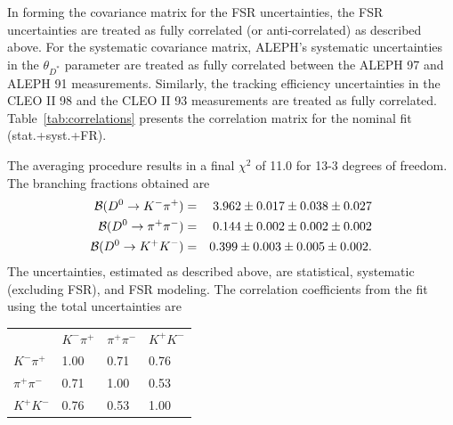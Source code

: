 In forming the covariance matrix for the FSR uncertainties, the FSR
uncertainties are treated as fully correlated (or anti-correlated) as 
described above.  For the systematic covariance matrix, ALEPH's systematic
uncertainties in the $\theta_{D^*}$ parameter are treated
as fully correlated between the ALEPH 97 and ALEPH 91 measurements.  Similarly,
the tracking efficiency uncertainties in the CLEO II 98 and the
CLEO II 93 measurements are treated as fully correlated.  
Table~\ref{tab:correlations} presents the correlation matrix for 
the nominal fit (stat.+syst.+FR).

The averaging procedure results in a 
final $\chi^2$ of 11.0 for 13-3 degrees 
of freedom.  The branching
fractions obtained are
\begin{eqnarray*}
  {\cal B}(D^0\to K^-\pi^+)   & = & 3.962 \pm 0.017 \pm 0.038 \pm 0.027 \\
  {\cal B}(D^0\to \pi^+\pi^-) & = & 0.144 \pm 0.002 \pm 0.002 \pm 0.002 \\
  {\cal B}(D^0\to K^+ K^-)    & = & 0.399 \pm 0.003 \pm 0.005 \pm 0.002. \\
\end{eqnarray*}The uncertainties, estimated as described above, are statistical, 
systematic (excluding FSR), and
FSR modeling.  The correlation coefficients from the fit using the 
total uncertainties are
\begin{center}
\begin{tabular}{llll}
               & $K^-\pi^+$ & $\pi^+\pi^-$ & $K^+ K^-$ \\
$K^-\pi^+$     &  1.00 & 0.71 & 0.76  \\
$\pi^+\pi^-$   &  0.71 & 1.00 & 0.53  \\
$K^+ K^-$      &  0.76 & 0.53 & 1.00  \\
\end{tabular}
\end{center}

